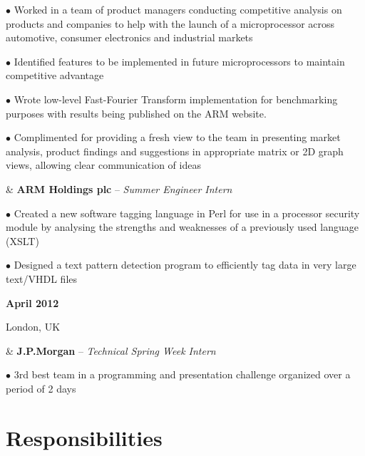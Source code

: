 \documentclass[a4paper,10pt,oneside]{article}
\begin{document}
\begin{body}
$\bullet$ Worked in a team of product managers conducting competitive analysis on products and companies to help with the launch of a microprocessor across automotive, consumer electronics and industrial markets

$\bullet$ Identified features to be implemented in future microprocessors to maintain competitive advantage 

$\bullet$ Wrote low-level Fast-Fourier Transform implementation for benchmarking purposes with results being published on the ARM website.

$\bullet$ Complimented for providing a fresh view to the team in presenting market analysis, product findings and suggestions in appropriate matrix or 2D graph views, allowing clear communication of ideas
\\ {\textbf{} \par {}} & \textbf{ARM Holdings plc} – \textit{Summer Engineer Intern}

$\bullet$ Created a new software tagging language in Perl for use in a processor security module by analysing the strengths and weaknesses of a previously used language (XSLT)

$\bullet$ Designed a text pattern detection program to efficiently tag data in very large text/VHDL files
\\ {\textbf{April 2012} \par London, UK} & \textbf{J.P.Morgan} – \textit{Technical Spring Week Intern}


$\bullet$ 3rd best team in a programming and presentation challenge organized over a period of 2 days

\end{body}

\section*{Responsibilities}
\end{document}
